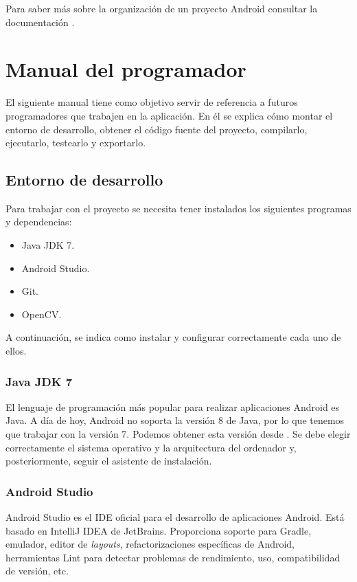 Para saber más sobre la organización de un proyecto Android consultar
la documentación \citep{android:folders}.

\section{Manual del programador}\label{manual-del-programador-1}

El siguiente manual tiene como objetivo servir de referencia a futuros
programadores que trabajen en la aplicación. En él se explica cómo
montar el entorno de desarrollo, obtener el código fuente del proyecto,
compilarlo, ejecutarlo, testearlo y exportarlo.

\subsection{Entorno de desarrollo}\label{entorno-de-desarrollo}

Para trabajar con el proyecto se necesita tener instalados los
siguientes programas y dependencias:

\begin{itemize}
\tightlist
\item
  Java JDK 7.
\item
  Android Studio.
\item
  Git.
\item
  OpenCV.
\end{itemize}

A continuación, se indica como instalar y configurar correctamente cada
uno de ellos.

\subsubsection{Java JDK 7}\label{java-jdk-7}

El lenguaje de programación más popular para realizar aplicaciones
Android es Java. A día de hoy, Android no soporta la versión 8 de Java,
por lo que tenemos que trabajar con la versión 7. Podemos obtener esta
versión desde \citep{java:jdk7}. Se debe elegir correctamente el sistema
operativo y la arquitectura del ordenador y, posteriormente, seguir el
asistente de instalación.

\subsubsection{Android Studio}\label{android-studio}

Android Studio es el IDE oficial para el desarrollo de aplicaciones
Android. Está basado en IntelliJ IDEA de JetBrains. Proporciona soporte
para Gradle, emulador, editor de \emph{layouts}, refactorizaciones
específicas de Android, herramientas Lint para detectar problemas de
rendimiento, uso, compatibilidad de versión, etc.

